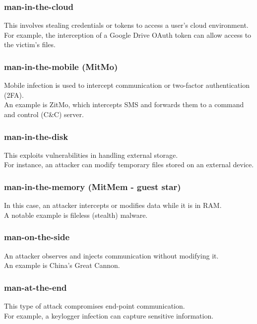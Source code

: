 \subsubsection{man-in-the-cloud}
This involves stealing credentials or tokens to access a user's cloud environment.\\ For example, the interception of a Google Drive OAuth token can allow access to the victim's files.

\subsubsection{man-in-the-mobile (MitMo)}
Mobile infection is used to intercept communication or two-factor authentication (2FA).\\ An example is ZitMo, which intercepts SMS and forwards them to a command and control (C\&C) server.

\subsubsection{man-in-the-disk}
This exploits vulnerabilities in handling external storage.\\ For instance, an attacker can modify temporary files stored on an external device.

\subsubsection{man-in-the-memory (MitMem - guest star)}
In this case, an attacker intercepts or modifies data while it is in RAM.\\ A notable example is fileless (stealth) malware.

\subsubsection{man-on-the-side}
An attacker observes and injects communication without modifying it.\\ An example is China's Great Cannon.

\subsubsection{man-at-the-end}
This type of attack compromises end-point communication.\\ For example, a keylogger infection can capture sensitive information.


